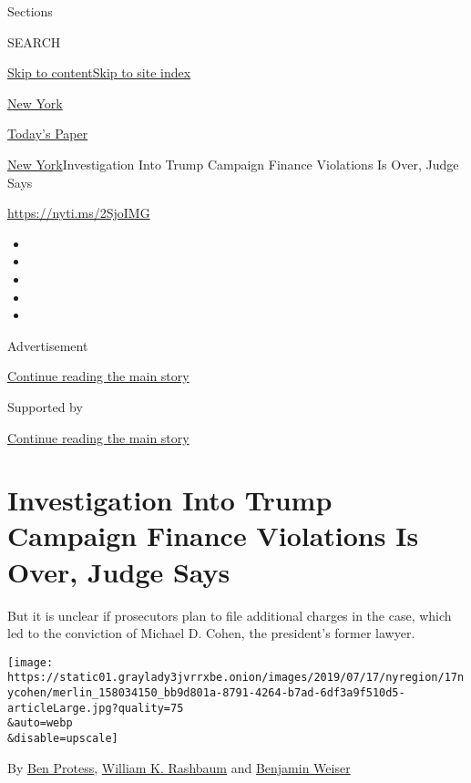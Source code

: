 Sections

SEARCH

\protect\hyperlink{site-content}{Skip to
content}\protect\hyperlink{site-index}{Skip to site index}

\href{https://www.nytimes3xbfgragh.onion/section/nyregion}{New York}

\href{https://myaccount.nytimes3xbfgragh.onion/auth/login?response_type=cookie\&client_id=vi}{}

\href{https://www.nytimes3xbfgragh.onion/section/todayspaper}{Today's
Paper}

\href{/section/nyregion}{New York}\textbar{}Investigation Into Trump
Campaign Finance Violations Is Over, Judge Says

\url{https://nyti.ms/2SjoIMG}

\begin{itemize}
\item
\item
\item
\item
\item
\end{itemize}

Advertisement

\protect\hyperlink{after-top}{Continue reading the main story}

Supported by

\protect\hyperlink{after-sponsor}{Continue reading the main story}

\hypertarget{investigation-into-trump-campaign-finance-violations-is-over-judge-says}{%
\section{Investigation Into Trump Campaign Finance Violations Is Over,
Judge
Says}\label{investigation-into-trump-campaign-finance-violations-is-over-judge-says}}

But it is unclear if prosecutors plan to file additional charges in the
case, which led to the conviction of Michael D. Cohen, the president's
former lawyer.

\texttt{[image: https://static01.graylady3jvrrxbe.onion/images/2019/07/17/nyregion/17nycohen/merlin\_158034150\_bb9d801a-8791-4264-b7ad-6df3a9f510d5-articleLarge.jpg?quality=75\\\&auto=webp\\\&disable=upscale]}

By \href{https://www.nytimes3xbfgragh.onion/by/ben-protess}{Ben
Protess},
\href{https://www.nytimes3xbfgragh.onion/by/william-k-rashbaum}{William
K. Rashbaum} and
\href{https://www.nytimes3xbfgragh.onion/by/benjamin-weiser}{Benjamin
Weiser}

